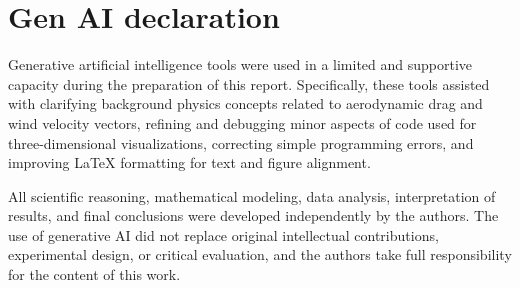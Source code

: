 \documentclass{article}
\begin{document}

\nocite{*}


\section*{Gen AI declaration} 

Generative artificial intelligence tools were used in a limited and supportive capacity during the preparation of this report. Specifically, these tools assisted with clarifying background physics concepts related to aerodynamic drag and wind velocity vectors, refining and debugging minor aspects of code used for three-dimensional visualizations, correcting simple programming errors, and improving LaTeX formatting for text and figure alignment.

All scientific reasoning, mathematical modeling, data analysis, interpretation of results, and final conclusions were developed independently by the authors. The use of generative AI did not replace original intellectual contributions, experimental design, or critical evaluation, and the authors take full responsibility for the content of this work.
\end{document}
